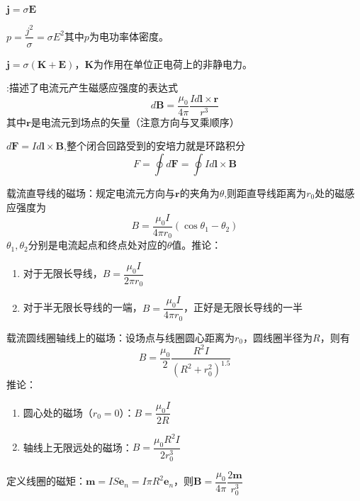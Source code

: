 $\bm{j}=\sigma \bm{E}$

$p=\dfrac{j^2}{\sigma}=\sigma E^2$其中$p$为电功率体密度。

$\bm{j}=\sigma (\bm{K}+\bm{E})$，$\bm{K}$为作用在单位正电荷上的非静电力。

{\color{Red}}:描述了电流元产生磁感应强度的表达式
\begin{equation}
    d\bm{B}=\dfrac{\mu_0}{4\pi}\dfrac{Id\bm{l}\times \bm{r}}{r^3}
\end{equation}
其中$\bm{r}$是电流元到场点的矢量（注意方向与叉乘顺序）

$d\bm{F}=Id\bm{l}\times \bm{B}$,整个闭合回路受到的安培力就是环路积分
\begin{equation}
    F=\oint d\bm{F}=\oint Id\bm{l}\times \bm{B}
\end{equation}

载流直导线的磁场：规定电流元方向与$\bm{r}$的夹角为$\theta$,则距直导线距离为$r_0$处的磁感应强度为
\begin{equation}
    B=\dfrac{\mu_0 I}{4\pi r_0}(\cos \theta_1 - \theta_2)
\end{equation}
$\theta_1, \theta_2$分别是电流起点和终点处对应的$\theta$值。推论：
\begin{enumerate}
    \item 对于无限长导线，$B=\dfrac{\mu_0 I}{2\pi r_0}$
    \item 对于半无限长导线的一端，$B=\dfrac{\mu_0 I}{4\pi r_0}$，正好是无限长导线的一半
\end{enumerate}

载流圆线圈轴线上的磁场：设场点与线圈圆心距离为$r_0$，圆线圈半径为$R$，则有
\begin{equation}
    B=\dfrac{\mu_0}{2}\dfrac{R^2 I}{(R^2+r_0^2)^{1.5}}
\end{equation}
推论：
\begin{enumerate}
    \item 圆心处的磁场（$r_0=0$）：$B=\dfrac{\mu_0 I}{2R}$
    \item 轴线上无限远处的磁场：$B=\dfrac{\mu_0 R^2 I}{2r_0^3}$
\end{enumerate}
定义线圈的磁矩：$\bm{m}=IS\bm{e}_n=I\pi R^2 \bm{e}_n $，则$\bm{B}=\dfrac{\mu_0}{4\pi}\dfrac{2\bm{m}}{r_0^3}$

